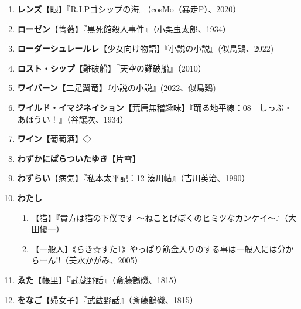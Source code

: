 \documentclass[twocolumn]{jsbook}
\newcommand{\ccite}[1]{《#1》}
\begin{document}
\begin{enumerate}
    \item \textbf{レンズ}【眼】『R.I.Pゴシップの海』（cosMo（暴走P）、2020）
    \item \textbf{ローゼン}【薔薇】『黒死館殺人事件』（小栗虫太郎、1934）
    \item \textbf{ローダーシュレールレ}【少女向け物語】『小説の小説』(似鳥鶏、2022)
    \item \textbf{ロスト・シップ}【難破船】『天空の難破船』（2010）
    \item \textbf{ワイバーン}【二足翼竜】『小説の小説』(2022、似鳥鶏)
    \item \textbf{ワイルド・イマジネイション}【荒唐無稽趣味】『踊る地平線：08　しっぷ・あほうい！』（谷譲次、1934）
    \item \textbf{ワイン}【葡萄酒】◇
    \item \textbf{わずかにぱらついたゆき}【片雪】
    \item \textbf{わずらい}【病気】『私本太平記：12 湊川帖』（吉川英治、1990）
    \item \textbf{わたし}
    \begin{enumerate}[label= \raise0.2ex\hbox{\textcircled{\scriptsize{\arabic*}}}]
        \item 【猫】『貴方は猫の下僕です ～ねことげぼくのヒミツなカンケイ～』（大田優一）
        \item 【一般人】\ccite{らき☆すた1}{やっぱり筋金入りのする事は\uline{一般人}には分からーん!!（美水かがみ、2005）}
    \end{enumerate}
    \item \textbf{ゑた}【帳里】『武蔵野話』（斎藤鶴磯、1815）
    \item \textbf{をなご}【婦女子】『武蔵野話』（斎藤鶴磯、1815）
\end{enumerate}
\end{document}
